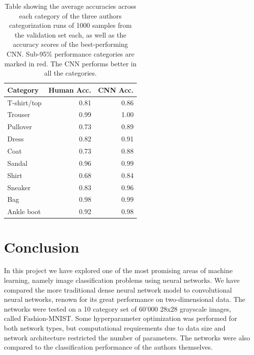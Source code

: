 \documentclass[10pt, twocolumn]{article}
\begin{document}
\begin{table}[H]
    \centering
    \begin{tabular}{l r r}
        \textbf{Category} &  \textbf{Human Acc.} & \textbf{CNN Acc.}  \\
        \hline
     T-shirt/top &      \color{red} 0.81 & \color{red} 0.86 \\
        \hline
         Trouser &      0.99 & 1.00 \\
        \hline
        Pullover &      \color{red} 0.73 & \color{red} 0.89 \\
        \hline
           Dress &      \color{red} 0.82 & \color{red} 0.91 \\
        \hline
            Coat &      \color{red} 0.73 & \color{red} 0.88 \\
        \hline
          Sandal &       0.96 & 0.99 \\
        \hline
           Shirt &      \color{red} 0.68 & \color{red} 0.84 \\
        \hline
         Sneaker &      \color{red}0.83 & 0.96 \\
        \hline
             Bag &      0.98 & 0.99 \\
        \hline
      Ankle boot &      \color{red} 0.92 & 0.98 \\
      \hline
    \end{tabular}
    \caption{Table showing the average accuracies across each category of the three authors categorization runs of 1000 samples from the validation set each, as well as the accuracy scores of the best-performing CNN. Sub-95\% performance categories are marked in red. The CNN performs better in all the categories.}
    \label{tab:human_performance_table}
\end{table}



\section{Conclusion}
In this project we have explored one of the most promising areas of machine learning, namely image classification problems using neural networks. We have compared the more traditional dense neural network model to convolutional neural networks, renown for its great performance on two-dimensional data. The networks were tested on a 10 category set of 60'000 28x28 grayscale images, called Fashion-MNIST. Some hyperparameter optimization was performed for both network types, but computational requirements due to data size and network architecture restricted the number of parameters. The networks were also compared to the classification performance of the authors themselves.
\end{document}
